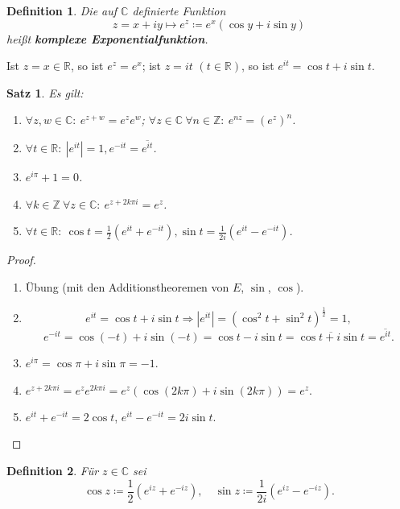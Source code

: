 \documentclass[12pt]{extreport} %
\newcommand{\C}{\mathbb{C}}
\newcommand{\R}{\mathbb{R}}
\newcommand{\Z}{\mathbb{Z}}
\theoremstyle{named}
\theoremstyle{itshape}
\newtheorem{satz}[unnamedtheorem]{Satz}
\newtheorem*{definition}{Definition}
\theoremstyle{normal}
\begin{document}
{\begin{definition}
Die auf $\C$ definierte Funktion $$ z=x+iy \mapsto  e^{z} \coloneqq e^{x} (\cos y + i \sin y) $$ hei{\ss}t \textbf{komplexe Exponentialfunktion}.
\end{definition}

Ist $z = x \in \R$, so ist $e^{z} = e^{x}$; ist $z = it$ $(t \in \R)$, so ist $e^{it} = \cos t + i \sin t$.


\begin{satz} \label{12.1:satz}
	Es gilt: 
	\begin{enumerate}
		\item $\forall z, w \in \C: ~ e^{z +w} = e^{z} e^{w}$; $\forall z \in \C ~ \forall n \in \Z: ~ e^{nz} = (e^{z})^n$. \label{12.1.a:satz}
		\item $\forall t \in \R: ~ |e^{it}| = 1, e^{-it} = \overline{e^{it}}$. \label{12.1.b:satz}
		\item $e^{i \pi} + 1 = 0$. \label{12.1.c:satz}
		\item $\forall k \in \Z ~ \forall z \in \C: ~ e^{z + 2 k \pi i} = e^{z}$. \label{12.1.d:satz}
		\item $\forall t \in \R: ~\cos t = \frac{1}{2} \left( e^{it} + e^{-it} \right), \sin t = \frac{1}{2i} \left( e^{it} - e^{-it} \right)$. \label{12.1.e:satz}
	\end{enumerate}
\end{satz}

\begin{proof} ~\
	\begin{enumerate}
		\item Übung (mit den Additionstheoremen von $E$, $\sin$, $\cos$).
		\item $$e^{it} = \cos t + i \sin t \Rightarrow |e^{it}| = (\cos^{2} t + \sin^{2} t)^{\frac{1}{2}} = 1,$$
		      $$ e^{-it} = \cos (-t) + i \sin (-t) = \cos t - i \sin t = \overline{\cos t + i \sin t} = \overline{e^{it}}. $$
		\item $e^{i\pi} = \cos \pi + i \sin \pi = -1$.
		\item $e^{z+2 k \pi i} = e^z e^{2 k \pi i}= e^z(\cos (2 k \pi) + i \sin (2k \pi)) = e^z.$ 
		\item $e^{it} + e^{-it} = 2 \cos t$, $e^{it} - e^{-it} = 2i \sin t$.
	\end{enumerate}
\end{proof}


\begin{definition}
	Für $z \in \C$ sei
	$$ \cos z \coloneqq \frac{1}{2} \left( e^{iz} + e^{-iz} \right), \quad \sin z \coloneqq \frac{1}{2 i} \left( e^{iz} - e^{-iz} \right). $$
\end{definition}


}
\end{document}
